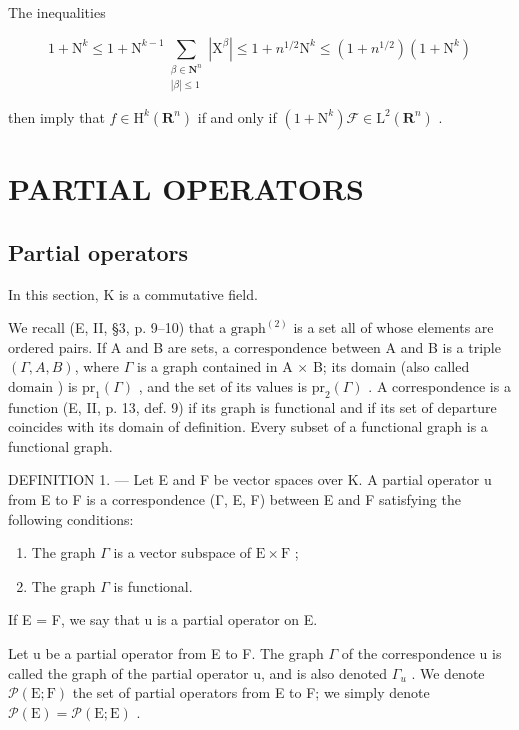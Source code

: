 The inequalities

\[
1 + \mathrm{N}^{k}\leqslant 1 + \mathrm{N}^{k - 1}\sum_{\substack{\beta \in \mathbf{N}^{n}\\ |\beta |\leqslant 1}}|\mathrm{X}^{\beta}|\leqslant 1 + n^{1 / 2}\mathrm{N}^{k}\leqslant (1 + n^{1 / 2})(1 + \mathrm{N}^{k})
\]

then imply that \(f \in \mathrm{H}^k(\mathbf{R}^n)\) if and only if \((1 + \mathrm{N}^k)\mathcal{F} \in \mathrm{L}^2(\mathbf{R}^n)\) .

\section{PARTIAL OPERATORS}

\subsection{Partial operators}

In this section, K is a commutative field.

We recall (E, II, §3, p. 9–10) that a \(\text{graph}^{(2)}\) is a set all of whose elements are ordered pairs. If A and B are sets, a \(\text{correspondence}\) between A and B is a triple \((\Gamma, A, B)\), where \(\Gamma\) is a graph contained in A × B; its domain (also called \(\text{domain}\) ) is \(\text{pr}_1(\Gamma)\) , and the set of its values is \(\text{pr}_2(\Gamma)\) . A correspondence is a \(\text{function}\) (E, II, p. 13, def. 9) if its graph is functional and if its set of departure coincides with its domain of definition. Every subset of a functional graph is a functional graph.

DEFINITION 1. --- Let E and F be vector spaces over K. A partial operator u from E to F is a correspondence (Γ, E, F) between E and F satisfying the following conditions:

\begin{enumerate}
\def\labelenumi{(\roman{enumi})}
\item
  The graph \(\Gamma\) is a vector subspace of \(\mathrm{E} \times \mathrm{F}\) ;
\item
  The graph \(\Gamma\) is functional.
\end{enumerate}

If E = F, we say that u is a partial operator on E.

Let u be a partial operator from E to F. The graph \(\Gamma\) of the correspondence u is called the graph of the partial operator u, and is also denoted \(\Gamma_{u}\) . We denote \(\mathcal{P}(\mathrm{E};\mathrm{F})\) the set of partial operators from E to F; we simply denote \(\mathcal{P}(\mathrm{E}) = \mathcal{P}(\mathrm{E};\mathrm{E})\) .

